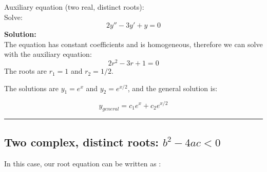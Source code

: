 \begin{exmp}{Auxiliary equation (two real, distinct roots):}\\
Solve:
\begin{equation*}
2y''-3y'+y=0
\end{equation*}
\textbf{Solution:}\\
The equation has constant coefficients and is homogeneous, therefore we can solve with the auxiliary equation:
\begin{equation*}
2r^2-3r+1=0
\end{equation*}
The roots are $r_1=1$ and $r_2=1/2$.

The solutions are $y_1=e^{x}$ and $y_2=e^{x/2}$, and the general solution is:

\begin{equation*}
y_{general}=c_1e^{x}+c_2e^{x/2}
\end{equation*}
\end{exmp}
%
%
%

\begin{center}
\noindent\rule{4cm}{0.4pt}
\end{center}


\subsection{Two complex, distinct roots: $b^2-4ac<0$}
In this case, our root equation can be written as :

